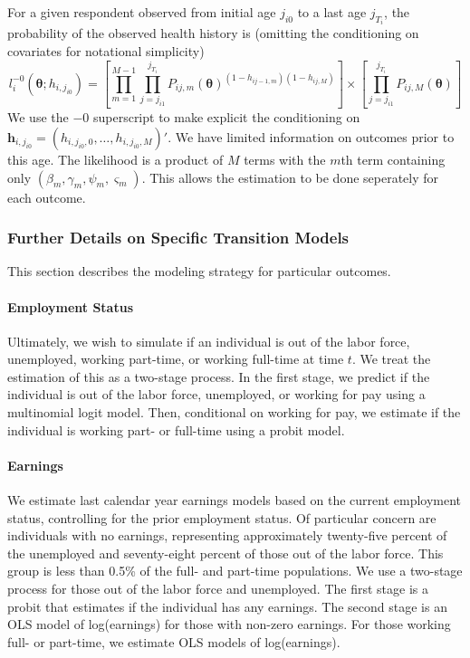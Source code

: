 For a given respondent observed from initial age $j_{i0}$ to a last age $j_{T_i}$, the probability of the observed health history is 
(omitting the conditioning on covariates for notational simplicity)
\[
	l^{-0}_i(\mathbf{\theta}; h_{i,j_{i0}}) = \left[\prod_{m=1}^{M-1} \prod_{j=j_{i1}}^{j_{T_i}} P_{ij,m}(\mathbf{\theta})^{(1-h_{ij-1,m})(1-h_{ij,M})} \right] \times \left[\prod_{j=j_{i1}}^{j_{T_i}} P_{ij,M}(\mathbf{\theta}) \right]
\]
We use the ${-0}$ superscript to make explicit the conditioning on $\mathbf{h}_{i,j_{i0}} = (h_{i,j_{i0},0},\ldots,h_{i,j_{i0},M})'$. We have limited information on outcomes prior to this age. 
The likelihood is a product of $M$ terms with the $m$th term containing only 
$(\beta_m, \gamma_m, \psi_m, \varsigma_m)$.  This allows the estimation
to be done seperately for each outcome.

\subsubsection{Further Details on Specific Transition Models}
This section describes the modeling strategy for particular outcomes.

\paragraph{Employment Status}
Ultimately, we wish to simulate if an individual is out of the labor force, unemployed, working part-time, or working full-time at 
time $t$.  We treat the estimation of this as a two-stage process.  In the first stage, we predict if the individual is out of 
the labor force, unemployed, or working for pay using a multinomial logit model.  Then, conditional on working for pay, we estimate if 
the individual is working part- or full-time using a probit model.

\paragraph{Earnings}
We estimate last calendar year earnings models based on the current employment status, controlling for the prior employment status.  
Of particular concern are individuals with no earnings, representing approximately twenty-five percent of the unemployed and 
seventy-eight percent of those out of the labor force.  This group is less than 0.5\% of the full- and part-time populations. We 
use a two-stage process for those out of the labor force and unemployed.  The first stage is a probit that estimates if the 
individual has any earnings.  The second stage is an OLS model of log(earnings) for those with non-zero earnings.  For 
those working full- or part-time, we estimate OLS models of log(earnings). 

